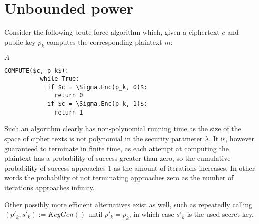 \documentclass[a4paper]{scrreprt}
\begin{document}
\section{Unbounded power}

Consider the following brute-force algorithm which, given a ciphertext $c$ and
public key $p_k$ computes the corresponding plaintext $m$:

\begin{library}{$A$}
	\begin{lstlisting}[mathescape=true,autogobble=true]
		COMPUTE($c, p_k$):
		  while True:
		    if $c = \Sigma.Enc(p_k, 0)$:
		      return 0
		    if $c = \Sigma.Enc(p_k, 1)$:
		      return 1
	\end{lstlisting}
\end{library}

Such an algorithm clearly has non-polynomial running time as the size of the
space of cipher texts is not polynomial in the security parameter $\lambda$.
It is, however guaranteed to terminate in finite time, as each attempt at
computing the plaintext has a probability of success greater than zero, so the
cumulative probability of success approaches $1$ as the amount of iterations
increases. In other words the probability of not terminating approaches zero as
the number of iterations approaches infinity.

Other possibly more efficient alternatives exist as well, such as repeatedly  
calling $(p'_k, s'_k) := KeyGen()$ until $p'_k = p_k$, in which case $s'_k$ is
the used secret key.
\end{document}
